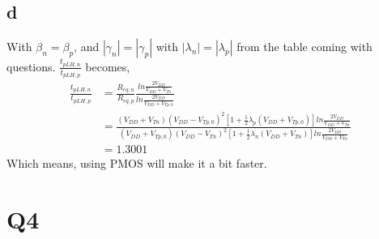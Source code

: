 \documentclass[a4paper,10pt]{article}
\begin{document}
\subsection*{d}
With \begin{math}\beta_n = \beta_p\end{math}, and \begin{math}|\gamma_n| = |\gamma_p|\end{math} with 
\begin{math}|\lambda_n| = |\lambda_p|\end{math} from the table coming with questions.
\begin{math}\frac{t_{pLH, n}}{t_{pLH, p}}\end{math} becomes,
\begin{equation}
 \begin{split}
  \frac{t_{pLH, n}}{t_{pLH, p}} &= \frac{R_{eq, n}}{R_{eq, p}}\frac{ln\frac{2V_{DD}}{V_{DD} + V_{Tn}}}{ln\frac{2V_{DD}}{V_{DD} + 
  V_{Tp, 0}}} \\
  &= \frac{(V_{DD}+V_{Tn})(V_{DD}-V_{Tp, 0})^2 [1+\frac{1}{2}\lambda_p(V_{DD}+V_{Tp, 0})]ln\frac{2V_{DD}}{V_{DD} + V_{Tn}}}
  {(V_{DD}+V_{Tp, 0})(V_{DD}-V_{Tn})^2 [1+\frac{1}{2}\lambda_n(V_{DD}+V_{Tn})]ln\frac{2V_{DD}}{V_{DD} + V_{Tn}}}\\
  &=1.3001
 \end{split}
\end{equation}
Which means, using PMOS will make it a bit faster.
\section*{Q4}
\end{document}
